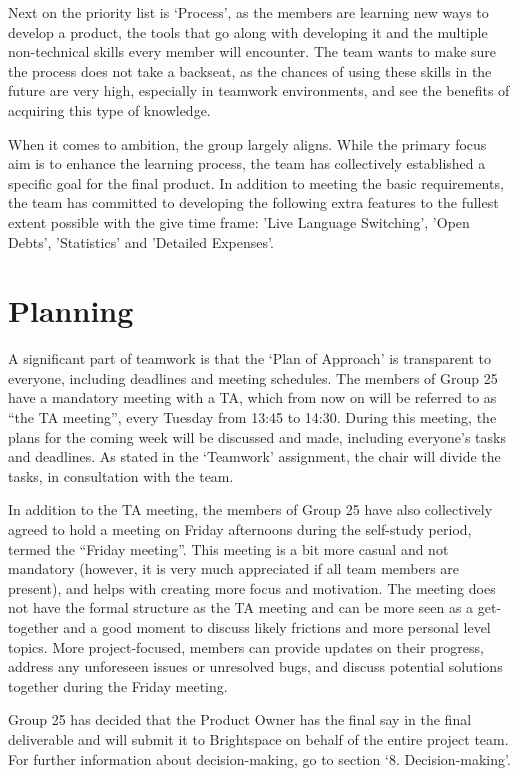 \documentclass[sigconf,nonacm]{acmart}
\begin{document}
Next on the priority list is ‘Process’, as the members are learning new ways to develop a product, the tools that go along with developing it and the multiple non-technical skills every member will encounter. The team wants to make sure the process does not take a backseat, as the chances of using these skills in the future are very high, especially in teamwork environments, and see the benefits of acquiring this type of knowledge.

When it comes to ambition, the group largely aligns. While the primary focus aim is to enhance the learning process, the team has collectively established a specific goal for the final product. In addition to meeting the basic requirements, the team has committed to developing the following extra features to the fullest extent possible with the give time frame: 'Live Language Switching', 'Open Debts', 'Statistics' and 'Detailed Expenses'.


\section{Planning}
A significant part of teamwork is that the ‘Plan of Approach’ is transparent to everyone, including deadlines and meeting schedules. The members of Group 25 have a mandatory meeting with a TA, which from now on will be referred to as “the TA meeting”, every Tuesday from 13:45 to 14:30. During this meeting, the plans for the coming week will be discussed and made, including everyone’s tasks and deadlines. As stated in the ‘Teamwork’ assignment, the chair will divide the tasks, in consultation with the team.

In addition to the TA meeting, the members of Group 25 have also collectively agreed to hold a meeting on Friday afternoons during the self-study period, termed the “Friday meeting”. This meeting is a bit more casual and not mandatory (however, it is very much appreciated if all team members are present), and helps with creating more focus and motivation. The meeting does not have the formal structure as the TA meeting and can be more seen as a get-together and a good moment to discuss likely frictions and more personal level topics. More project-focused, members can provide updates on their progress, address any unforeseen issues or unresolved bugs, and discuss potential solutions together during the Friday meeting.

Group 25 has decided that the Product Owner has the final say in the final deliverable and will submit it to Brightspace on behalf of the entire project team. For further information about decision-making, go to section ‘8. Decision-making’.
\end{document}
